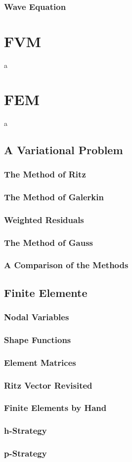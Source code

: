 \documentclass[
    final,
    a4paper,
    oneside,
    parskip=full,
    headings=standardclasses,
    headings=big,
    pointednumbers,
    fleqn,
    numbers=noenddot
]{scrartcl}
\begin{document}
    \subsubsection{Wave Equation}

    \section{FVM}
    a

    \section{FEM}
    a

    \subsection{A Variational Problem}
    \subsubsection{The Method of Ritz}
    \subsubsection{The Method of Galerkin}
    \subsubsection{Weighted Residuals}
    \subsubsection{The Method of Gauss}
    \subsubsection{A Comparison of the Methods}

    \subsection{Finite Elemente}

    \subsubsection{Nodal Variables}
    \subsubsection{Shape Functions}
    \subsubsection{Element Matrices}
    \subsubsection{Ritz Vector Revisited}
    \subsubsection{Finite Elements by Hand}
    \subsubsection{h-Strategy}
    \subsubsection{p-Strategy}
\end{document}

